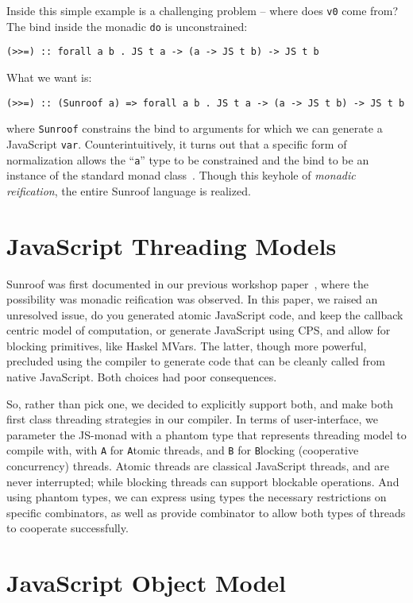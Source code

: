 \documentclass{llncs}
\begin{document}
Inside this simple example is a challenging problem -- where does
\verb|v0| come from? The bind inside the monadic \verb|do| is
unconstrained:
\begin{verbatim}
(>>=) :: forall a b . JS t a -> (a -> JS t b) -> JS t b
\end{verbatim}
\noindent  What we want is:
\begin{verbatim}
(>>=) :: (Sunroof a) => forall a b . JS t a -> (a -> JS t b) -> JS t b
\end{verbatim}
\noindent where \verb|Sunroof| constrains the bind to
arguments for which we can generate a JavaScript \verb|var|.
Counterintuitively, 
it turns out that a specific form of normalization allows 
the ``\verb|a|'' type to be constrained and the bind to 
be an instance of the standard monad class~\cite{Sculthorpe:13:ConstrainedMonad}.
Though this keyhole of {\em monadic reification\/},
the entire Sunroof language is realized.

\section{JavaScript Threading Models}

Sunroof was first documented in our previous 
workshop paper~\cite{Farmer:12:WebDSLs},
where the possibility was monadic reification was observed.
In this paper, we raised an unresolved issue, do you
generated atomic JavaScript code, and keep the callback
centric model of computation, or generate JavaScript
using CPS, and allow for blocking primitives,
like Haskel MVars. The latter, though more powerful, 
precluded using the compiler to generate
code that can be cleanly called from native JavaScript.
Both choices had poor consequences.

So, rather than pick one, we decided to explicitly support both,
and make both first class threading strategies in our compiler.
In terms of user-interface, we parameter the JS-monad
with a phantom type that represents threading model
to compile with, with \verb|A| for {\tt A}tomic threads,
and \verb|B| for {\tt B}locking (cooperative concurrency) threads. 
Atomic threads are classical JavaScript threads, and
are never interrupted; while blocking threads can
support blockable operations. And using phantom
types, we can express using types the necessary
restrictions on specific combinators, as well
as provide combinator to allow both types of
threads to cooperate successfully.

\section{JavaScript Object Model}
\end{document}
